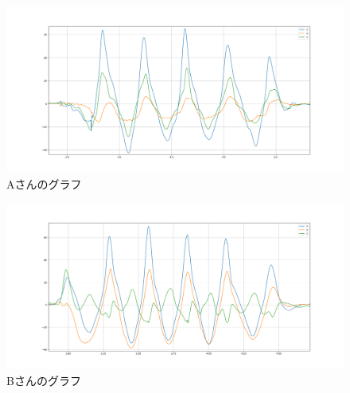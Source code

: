         \begin{figure}[h]
            \vspace{45mm}
            \hspace{-1cm}
            \includegraphics[scale=0.2]{images_S5/sintyoku_51.eps}
            \vspace{-0.5cm}
            \caption{Aさんのグラフ}
            \label{fig:graph1}
        \end{figure}
        \begin{figure}[h]
            \vspace{45mm}
            \hspace{-1cm}
            \includegraphics[scale=0.2]{images_S5/sintyoku_52.eps}
            \vspace{-0.5cm}
            \caption{Bさんのグラフ}
            \label{fig:graph2}
        \end{figure}
